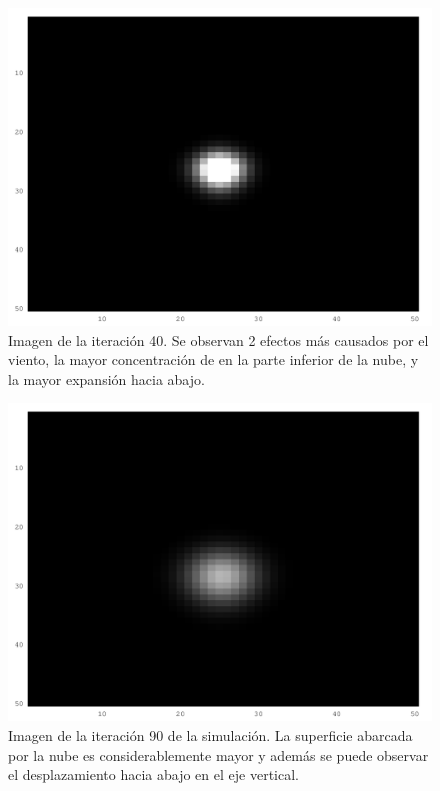 \documentclass[twocolumn,a4paper,10pt]{article}
\begin{document}
\begin{figure}[H]
        \includegraphics[width=\linewidth]{./images/iteration-40.png}
        \caption{Imagen de la iteraci\'on 40. Se observan 2 efectos m\'as causados por el viento, la mayor concentraci\'on de en la parte inferior de la nube, y 
        la mayor expansi\'on hacia abajo.}
        \label{fig:40-iteraciones}
\end{figure}

\begin{figure}[H]
        \includegraphics[width=\linewidth]{./images/iteration-90.png}
        \caption{Imagen de la iteraci\'on 90 de la simulaci\'on. La superficie abarcada por la nube es considerablemente mayor y además se puede observar 
        el desplazamiento hacia abajo en el eje vertical.}
        \label{fig:90-iteraciones}
\end{figure}
\end{document}
